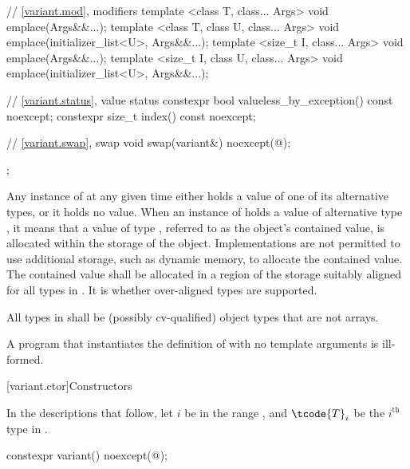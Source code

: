 \begin{codeblock}
{{      // \ref{variant.mod}, modifiers
      template <class T, class... Args>
        void emplace(Args&&...);
      template <class T, class U, class... Args>
        void emplace(initializer_list<U>, Args&&...);
      template <size_t I, class... Args>
        void emplace(Args&&...);
      template <size_t I, class U, class... Args>
        void emplace(initializer_list<U>, Args&&...);

      // \ref{variant.status}, value status
      constexpr bool valueless_by_exception() const noexcept;
      constexpr size_t index() const noexcept;

      // \ref{variant.swap}, swap
      void swap(variant&) noexcept(@\seebelow@);
    };
}
\end{codeblock}

\pnum
Any instance of  at any given time either holds a value
of one of its alternative types, or it holds no value.
When an instance of  holds a value of alternative type ,
it means that a value of type , referred to as the 
object's contained value, is allocated within the storage of the
 object.
Implementations are not permitted to use additional storage, such as dynamic
memory, to allocate the contained value.
The contained value shall be allocated in a region of the 
storage suitably aligned for all types in .
It is 
whether over-aligned types are supported.

\pnum
All types in  shall be (possibly cv-qualified)
object types that are not arrays.

\pnum
A program that instantiates the definition of  with
no template arguments is ill-formed.

[variant.ctor]{Constructors}

\pnum
In the descriptions that follow, let $i$ be in the range ,
and $\tcode{T}_i$ be the $i^\text{th}$ type in .

%
\begin{itemdecl}
constexpr variant() noexcept(@\seebelow@);
\end{itemdecl}

